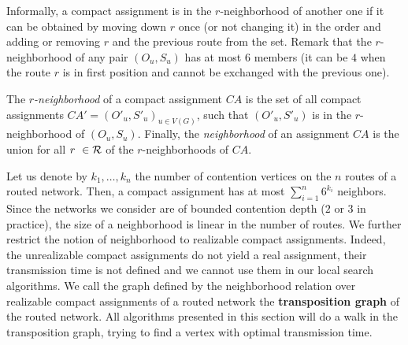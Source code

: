 Informally, a compact assignment is in the $r$-neighborhood of another one if it can be obtained by 
moving down $r$ once (or not changing it) in the order and adding or removing $r$ and the previous route from the set. 
Remark that the $r$-neighborhood of any pair $(O_u,S_u)$ has at most $6$ members (it can be $4$ when the route $r$ is in first position and cannot be exchanged with the previous one). 

The \emph{$r$-neighborhood} of a compact assignment $CA$ is the set of all compact assignments $CA'=(O'_u,S'_u)_{u \in V(G)}$, such that  $(O'_u,S'_u)$ is in the $r$-neighborhood of $(O_u,S_u)$. Finally, the \emph{neighborhood} of an assignment $CA$ is the union for all $r \in {\cal R}$ of the $r$-neighborhoods of $CA$.

 Let us denote by $k_1,\ldots,k_n$ the number of contention vertices on the $n$ routes of 
 a routed network. Then, a compact assignment has at most $\sum_{i=1}^n 6^{k_i}$ neighbors. Since the networks we consider are of bounded contention depth ($2$ or $3$ in practice), the size of a neighborhood is linear in the number of routes.  We further restrict the notion of neighborhood to realizable compact assignments. Indeed, the unrealizable compact assignments do not yield a real assignment, their transmission time is not defined and we cannot use them in our local search algorithms. We call the graph defined by the neighborhood relation over realizable compact assignments of a routed network the \textbf{transposition graph} of the routed network. 
  All algorithms presented in this section will do a walk in the transposition graph, trying to find a vertex with optimal
  transmission time. 


